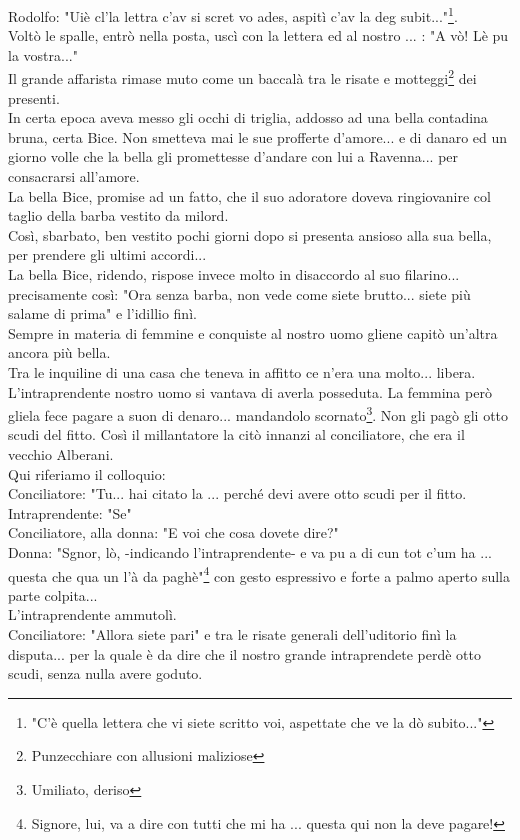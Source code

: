 \documentclass[10pt]{memoir} %
\begin{document}
Rodolfo: "Uiè cl'la lettra c'av si scret vo ades, aspitì c'av la deg subit..."\footnote{"C'è quella lettera che vi siete scritto voi, aspettate che ve la dò subito..."}.\\
Voltò le spalle, entrò nella posta, uscì con la lettera ed al nostro .\:.\:.\: : "A vò! Lè pu la vostra..."\\
Il grande affarista rimase muto come un baccalà tra le risate e motteggi\footnote{Punzecchiare con allusioni maliziose} dei presenti.\\
In certa epoca aveva messo gli occhi di triglia, addosso ad una bella contadina bruna, certa Bice. Non smetteva mai le sue profferte d'amore... e di danaro ed un giorno volle che la bella gli promettesse d'andare con lui a Ravenna... per consacrarsi all'amore.\\
La bella Bice, promise ad un fatto, che il suo adoratore doveva ringiovanire col taglio della barba vestito da milord.\\
Così, sbarbato, ben vestito pochi giorni dopo si presenta ansioso alla sua bella, per prendere gli ultimi accordi...\\
La bella Bice, ridendo, rispose invece molto in disaccordo al suo filarino... precisamente così: "Ora senza barba, non vede come siete brutto... siete più salame di prima" e l'idillio finì.\\
Sempre in materia di femmine e conquiste al nostro uomo gliene capitò un'altra ancora più bella.\\
Tra le inquiline di una casa che teneva in affitto ce n'era una molto... libera. L'intraprendente nostro uomo si vantava di averla posseduta. La femmina però gliela fece pagare a suon di denaro... mandandolo scornato\footnote{Umiliato, deriso}. Non gli pagò gli otto scudi del fitto. Così il millantatore la citò innanzi al conciliatore, che era il vecchio Alberani.\\
Qui riferiamo il colloquio:\\
Conciliatore: "Tu... hai citato la .\:.\:. perché devi avere otto scudi per il fitto.\\
Intraprendente: "Se"\\
Conciliatore, alla donna: "E voi che cosa dovete dire?"\\
Donna: "Sgnor, lò, -indicando l'intraprendente- e va pu a di cun tot c'um ha .\:.\:. questa che qua un l'à da paghè"\footnote{Signore, lui, va a dire con tutti che mi ha .\:.\:. questa qui non la deve pagare!} con gesto espressivo e forte a palmo aperto sulla parte colpita...\\
L'intraprendente ammutolì.\\
Conciliatore: "Allora siete pari" e tra le risate generali dell'uditorio finì la disputa... per la quale è da dire che il nostro grande intraprendete perdè otto scudi, senza nulla avere goduto. 
\end{document}
